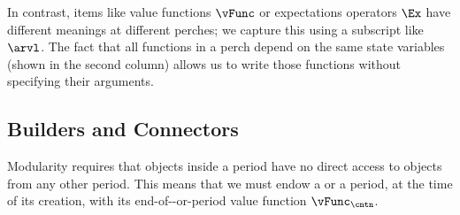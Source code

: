   In contrast, items like value functions $\vFunc$ or expectations operators $\Ex$ have different meanings at different perches; we capture this using a subscript like $\arvl$.  The fact that all functions in a perch depend on the same state variables (shown in the second column) allows us to write those functions without specifying their arguments.


\ifpseudo{
\nopagebreak
}{}

\hypertarget{transitions}{}
\subsection{Builders and Connectors}\label{subsec:transitions}\label{subsubsec:builders}

Modularity requires that objects inside a period have no direct access to objects from any other period.  This means that we must endow a {\stg} or a period, at the time of its creation, with its end-of-{\stg}-or-period value function $\vFunc_{\cntn}$.

